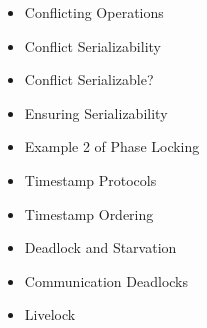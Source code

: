 \documentclass[12pt]{article}
\begin{document}
\begin{itemize}
    \item Conflicting Operations
    \item Conflict Serializability
    \item Conflict Serializable?
    \item Ensuring Serializability
    \item Example 2 of Phase Locking
    \item Timestamp Protocols
    \item Timestamp Ordering
    \item Deadlock and Starvation
    \item Communication Deadlocks
    \item Livelock
\end{itemize}
\end{document}
